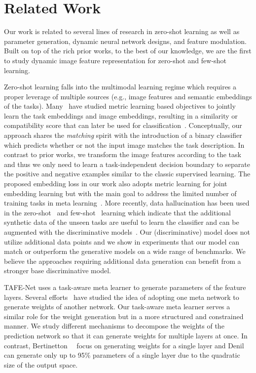 \documentclass[10pt,twocolumn,letterpaper]{article}
\newcommand{\model}{TAFE-Net\xspace}
\begin{document}
 	\section{Related Work}
Our work is related to several lines of research in zero-shot learning as well as parameter generation, dynamic neural 
network designs, and feature modulation. Built on top of the rich prior works, to the best of our knowledge, we are the first to study dynamic image feature representation for zero-shot and few-shot learning. 

Zero-shot learning falls into the multimodal learning regime 
which requires a proper leverage of multiple sources (e.g., image features and semantic embeddings of the tasks). Many~\cite{koch2015siamese, yang2018learning, vinyals2016matching, zhang2016zero, Changpinyo_2016_CVPR, frome2013devise} 
have studied metric learning based objectives to jointly learn the task embeddings and image embeddings, resulting in a similarity
or compatibility score that can later be used for classification~\cite{misra2017red,vinyals2016matching,lampert2014attribute,akata2016label,akata2015evaluation,frome2013devise,socher2013zero}. Conceptually, our
approach shares the \emph{matching} spirit with the introduction of a 
binary classifier which predicts whether or not the input image matches the task description. 
In contrast to prior works, we transform the image features according to the task and thus we only need to learn a task-independent 
decision boundary to separate the positive and negative examples similar to the classic supervised learning. The proposed embedding loss in our work also adopts metric learning for joint embedding 
learning but with the main goal to address the limited number of training tasks in meta learning~\cite{finn2017one}. More 
recently, data hallucination has been used in the zero-shot~\cite{xian2018feature,zhu2018generative} and few-shot~\cite{hariharan2017low,wang2018low} learning which indicate that the additional synthetic data of the unseen tasks are useful to learn the classifier and can be augmented with the discriminative models~\cite{xian2018feature,wang2018low}. Our (discriminative) model does not utilize additional data points and we show in experiments that our model can match or outperform the 
generative models on a wide range of benchmarks. We believe the approaches requiring additional data generation can benefit from a 
stronger base discriminative model.

\model uses a task-aware meta learner to generate parameters of the
feature layers. Several efforts~\cite{bertinetto2016learning,ha2016hypernetworks,denil2013predicting} have studied the idea of
adopting one  meta network to generate weights of another network.
Our task-aware meta learner serves a similar role for the weight generation 
but in a more structured and constrained manner. We study different mechanisms to decompose the weights of the prediction network so that it can generate weights for multiple layers at once. In contrast, Bertinetton~\etal~\cite{bertinetto2016learning} 
focus on generating weights for a single layer and Denil~\etal~\cite{denil2013predicting} can generate only up to 95\% parameters of a single layer due to the quadratic size of the output space. 
\end{document}
